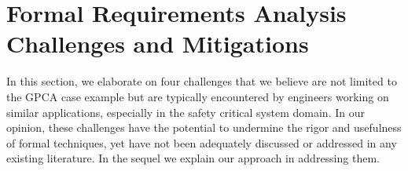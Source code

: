 \section{Formal Requirements Analysis Challenges and Mitigations}
\label{sec:challenge}

In this section, we elaborate on four challenges that we believe are not limited to the GPCA case example but are typically encountered by engineers working on similar applications, especially in the safety critical system domain. In our opinion, these challenges have the potential to undermine the rigor and usefulness of formal techniques, yet have not been adequately discussed or addressed in any existing literature. In the sequel we explain our approach in addressing them.



